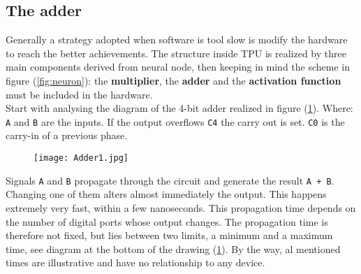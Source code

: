 \subsection{The adder}
\label{ssec:hard-adder}
Generally a strategy adopted when software is tool slow is modify the hardware
to reach the better achievements.
The structure inside TPU is realized by three main components derived from 
neural node, then keeping in mind the scheme in figure (\ref{fig:neuron}): the 
\textbf{multiplier}, the \textbf{adder} and the \textbf{activation function} 
must be included in the hardware.\\
Start with analysing the diagram of the 4-bit adder realized in figure
(\ref{fig:4-bit-adder}).\hfill \break
Where: \texttt{A} and \texttt{B} are the inputs. If the output overflows 
\texttt{C4} the carry out is set. \texttt{C0} is the carry-in of a previous 
phase.\cite{TPU:explained}
%
\begin{figure}[!h]
	\centering
	\texttt{[image: Adder1.jpg]}
	\label{fig:4-bit-adder}
\end{figure}
%
Signals \texttt{A} and \texttt{B} propagate through the circuit and generate the
result \texttt{A + B}. Changing one of them alters almost immediately the
output. This happens extremely very fast, within a few nanoseconds. This
propagation time depends on the number of digital ports whose output changes.
The propagation time is therefore not fixed, but lies between two limits, a
minimum and a maximum time, see diagram at the bottom of the drawing
(\ref{fig:4-bit-adder}). By the way, al mentioned times are illustrative and
have no relationship to any device.\cite{TPU:explained}
%
\newpage
